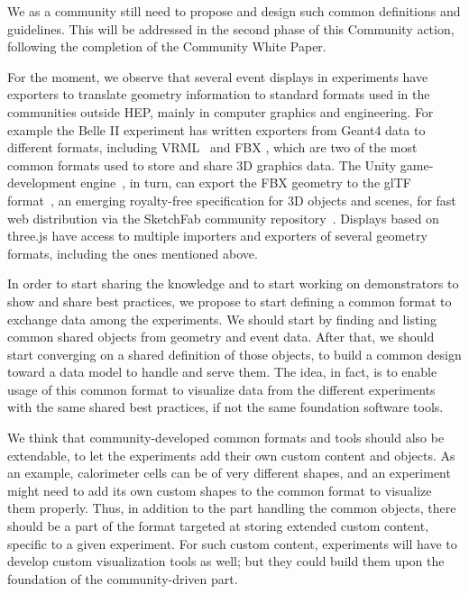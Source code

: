 \documentclass[12pt,a4paper]{article}
\begin{document}
We as a community still need to propose and design such common definitions and guidelines. This will
be addressed in the second phase of this Community action, following the completion of the Community White Paper.

For the moment, we observe that several event displays in experiments have exporters to translate geometry information to standard
formats used in the communities outside HEP, mainly in computer graphics and engineering. For example the Belle II experiment has
written exporters from Geant4 data to different formats, including VRML~\cite{vrml} and FBX \cite{BelleIIGeoExporters}, which are two of the most
common formats used to store and share 3D graphics data. The Unity game-development engine~\cite{Unity3D}, in turn, can export the
FBX geometry to the glTF format~\cite{glTF}, an emerging royalty-free specification for 3D objects and scenes, for fast web distribution
via the SketchFab community repository~\cite{SketchFabBelleII,SketchFab}. Displays based on three.js have access to multiple importers and exporters
of several geometry formats, including the ones mentioned above. %

In order to start sharing the knowledge and to start working on demonstrators to show and share best practices, we propose to start
defining a common format to exchange data among the experiments. We should start by finding and listing common shared objects from
geometry and event data. After that, we should start converging on a shared definition of those objects, to build a common design
toward a data model to handle and serve them. The idea, in fact, is to enable usage of this common format to visualize data from
the different experiments with the same shared best practices, if not the same foundation software tools.

We think that community-developed common formats and tools should also be extendable, to let the experiments add their own custom
content and objects. As an example, calorimeter cells can be of very different shapes, and an experiment might need to add its own
custom shapes to the common format to visualize them properly. Thus, in addition to the part handling the common objects, there should
be a part of the format targeted at storing extended custom content, specific to a given experiment. For such custom content,
experiments will have to develop custom visualization tools as well; but they could build them upon the foundation
of the community-driven part.
\end{document}
